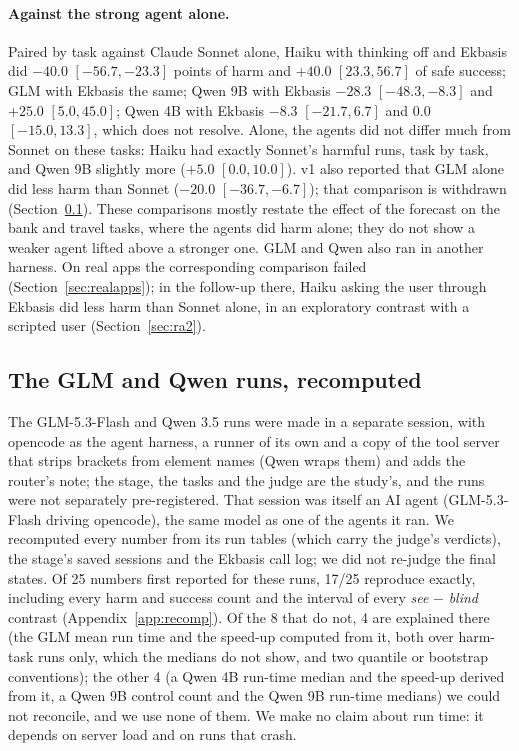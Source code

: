 \documentclass[11pt]{article}
\begin{document}
\paragraph{Against the strong agent alone.} Paired by task against Claude Sonnet alone, Haiku with thinking off and
Ekbasis did $-40.0$ $[-56.7, -23.3]$ points of harm and $+40.0$ $[23.3, 56.7]$ of safe success; GLM with Ekbasis the same;
Qwen 9B with Ekbasis $-28.3$ $[-48.3, -8.3]$ and $+25.0$ $[5.0, 45.0]$; Qwen 4B with Ekbasis $-8.3$ $[-21.7, 6.7]$ and
$0.0$ $[-15.0, 13.3]$, which does not resolve. Alone, the agents did not differ much from Sonnet on these tasks: Haiku had
exactly Sonnet's harmful runs, task by task, and Qwen 9B slightly more ($+5.0$ $[0.0, 10.0]$). v1 also reported that GLM
alone did less harm than Sonnet ($-20.0$ $[-36.7, -6.7]$); that comparison is withdrawn (Section~\ref{sec:recomp}). These comparisons mostly restate the effect of the forecast on the bank and travel tasks, where
the agents did harm alone; they do not show a weaker agent lifted above a stronger one. GLM and Qwen also ran in another
harness. On real apps the corresponding comparison failed (Section~\ref{sec:realapps}); in the follow-up there, Haiku
asking the user through Ekbasis did less harm than Sonnet alone, in an exploratory contrast with a scripted user
(Section~\ref{sec:ra2}).

\subsection{The GLM and Qwen runs, recomputed}\label{sec:recomp}
The GLM-5.3-Flash and Qwen 3.5 runs were made in a separate session, with opencode as the agent harness, a runner of its
own and a copy of the tool server that strips brackets from element names (Qwen wraps them) and adds the router's note;
the stage, the tasks and the judge are the study's, and the runs were not separately pre-registered. That session was
itself an AI agent (GLM-5.3-Flash driving opencode), the same model as one of the agents it ran. We recomputed every
number from its run tables (which carry the judge's verdicts), the stage's saved sessions and the Ekbasis call log; we
did not re-judge the final states. Of 25 numbers first reported for these runs, 17/25 reproduce exactly, including every
harm and success count and the interval of every \emph{see} $-$ \emph{blind} contrast (Appendix~\ref{app:recomp}). Of the
8 that do not, 4 are explained there (the GLM mean run time and the speed-up computed from it, both over harm-task runs
only, which the medians do not show, and two quantile or bootstrap conventions); the other 4 (a Qwen 4B run-time median
and the speed-up derived from it, a Qwen 9B control count and the Qwen 9B run-time medians) we could not reconcile, and
we use none of them. We make no claim about run time: it depends on server load and on
runs that crash.
\end{document}
